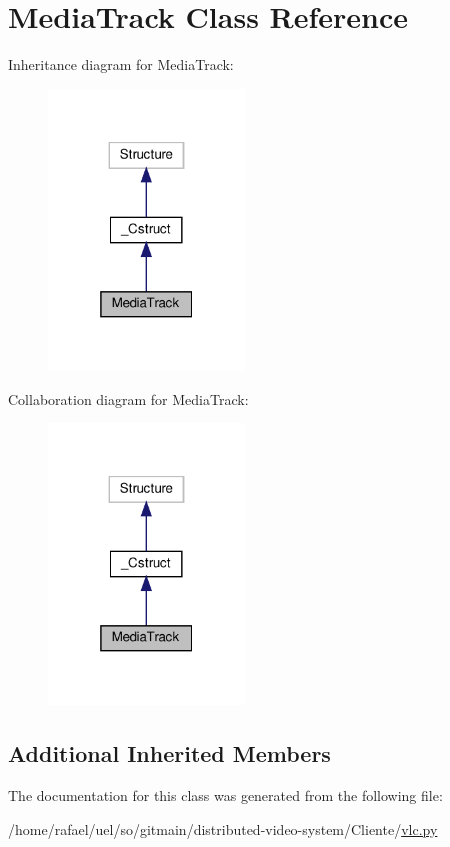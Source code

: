 \hypertarget{classvlc_1_1_media_track}{}\section{Media\+Track Class Reference}
\label{classvlc_1_1_media_track}


Inheritance diagram for Media\+Track\+:
\nopagebreak
\begin{figure}[H]
\begin{center}
\leavevmode
\includegraphics[width=148pt]{classvlc_1_1_media_track__inherit__graph}
\end{center}
\end{figure}


Collaboration diagram for Media\+Track\+:
\nopagebreak
\begin{figure}[H]
\begin{center}
\leavevmode
\includegraphics[width=148pt]{classvlc_1_1_media_track__coll__graph}
\end{center}
\end{figure}
\subsection*{Additional Inherited Members}


The documentation for this class was generated from the following file\+:\begin{DoxyCompactItemize}
\item 
/home/rafael/uel/so/gitmain/distributed-\/video-\/system/\+Cliente/\hyperlink{vlc_8py}{vlc.\+py}\end{DoxyCompactItemize}
